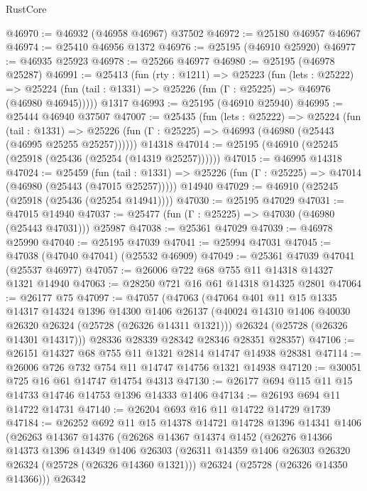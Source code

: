\begin{lexlean}{RustCore}
\begin{coremodule}
@46970 := @46932 (@46958 @46967) @37502
@46972 := @25180 @46957 @46967
@46974 := @25410 @46956 @1372
@46976 := @25195 (@46910 @25920)
@46977 := @46935 @25923
@46978 := @25266 @46977
@46980 := @25195 (@46978 @25287)
@46991 := @25413
    (fun (rty : @1211) =>
    @25223
      (fun (lets : @25222) =>
      @25224 (fun (tail : @1331) => @25226 (fun (Γ : @25225) => @46976 (@46980 @46945)))))
    @1317
@46993 := @25195 (@46910 @25940)
@46995 := @25444 @46940 @37507
@47007 := @25435
    (fun (lets : @25222) =>
    @25224
      (fun (tail : @1331) =>
      @25226 (fun (Γ : @25225) => @46993 (@46980 (@25443 (@46995 @25255 @25257))))))
    @14318
@47014 := @25195 (@46910 (@25245 (@25918 (@25436 (@25254 (@14319 @25257))))))
@47015 := @46995 @14318
@47024 := @25459
    (fun (tail : @1331) => @25226 (fun (Γ : @25225) => @47014 (@46980 (@25443 (@47015 @25257)))))
    @14940
@47029 := @46910 (@25245 (@25918 (@25436 (@25254 @14941))))
@47030 := @25195 @47029
@47031 := @47015 @14940
@47037 := @25477 (fun (Γ : @25225) => @47030 (@46980 (@25443 @47031))) @25987
@47038 := @25361 @47029
@47039 := @46978 @25990
@47040 := @25195 @47039
@47041 := @25994 @47031
@47045 := @47038 (@47040 @47041) (@25532 @46909)
@47049 := @25361 @47039 @47041 (@25537 @46977)
@47057 := @26006 @722 @68 @755 @11 @14318 @14327 @1321 @14940
@47063 := @28250 @721 @16 @61 @14318 @14325 @2801
@47064 := @26177 @75
@47097 := @47057
    (@47063
      (@47064
        @401
        @11
        @15
        @1335
        @14317
        @14324
        @1396
        @14300
        @1406
        @26137
        (@40024 @14310 @1406 @40030 @26320 @26324 (@25728 (@26326 @14311 @1321)))
        @26324
        (@25728 (@26326 @14301 @14317)))
      @28336
      @28339
      @28342
      @28346
      @28351
      @28357)
@47106 := @26151 @14327 @68 @755 @11 @1321 @2814 @14747 @14938 @28381
@47114 := @26006 @726 @732 @754 @11 @14747 @14756 @1321 @14938
@47120 := @30051 @725 @16 @61 @14747 @14754 @4313
@47130 := @26177 @694 @115 @11 @15 @14733 @14746 @14753 @1396 @14333 @1406
@47134 := @26193 @694 @11 @14722 @14731
@47140 := @26204 @693 @16 @11 @14722 @14729 @1739
@47184 := @26252
    @692
    @11
    @15
    @14378
    @14721
    @14728
    @1396
    @14341
    @1406
    (@26263
      @14367
      @14376
      (@26268
        @14367
        @14374
        @1452
        (@26276
          @14366
          @14373
          @1396
          @14349
          @1406
          @26303
          (@26311 @14359 @1406 @26303 @26320 @26324 (@25728 (@26326 @14360 @1321)))
          @26324
          (@25728 (@26326 @14350 @14366)))
        @26342

\end{coremodule}
\end{lexlean}
